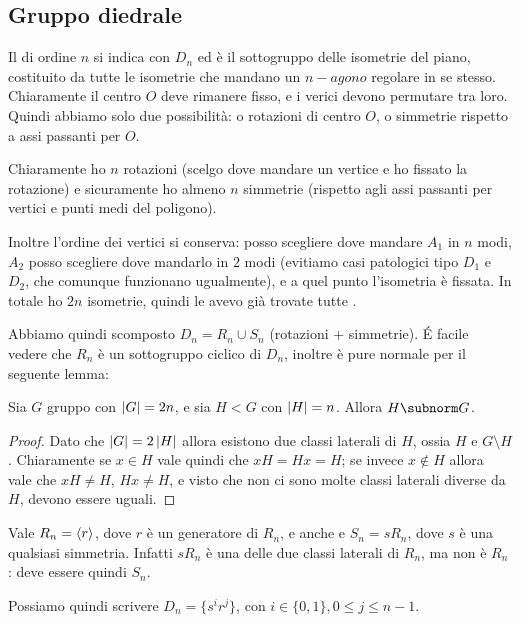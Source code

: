 \documentclass[a4paper,10pt,oneside]{math_article}
\begin{document}
      \subsection{Gruppo diedrale}
      Il  di ordine $n$ si indica con $D_n$ ed è il sottogruppo delle isometrie del piano, costituito da tutte le isometrie che mandano un $n-agono$ regolare in se stesso. Chiaramente il centro $O$ deve rimanere fisso, e i verici devono permutare tra loro. Quindi abbiamo solo due possibilità: o rotazioni di centro $O$, o simmetrie rispetto a assi passanti per $O$.
      
      Chiaramente ho $n$ rotazioni (scelgo dove mandare un vertice e ho fissato la rotazione) e sicuramente ho almeno $n$ simmetrie (rispetto agli assi passanti per vertici e punti medi del poligono). 
      
      Inoltre l'ordine dei vertici si conserva: posso scegliere dove mandare $A_1$ in $n$ modi, $A_2$ posso scegliere dove mandarlo in $2$ modi (evitiamo casi patologici tipo $D_1$ e $D_2$, che comunque funzionano ugualmente), e a quel punto l'isometria è fissata. In totale ho $2n$ isometrie, quindi le avevo già trovate tutte \Cooley.
      
      Abbiamo quindi scomposto $D_n = R_n \cup S_n$ (rotazioni + simmetrie). \'E facile vedere che $R_n$ è un sottogruppo ciclico di $D_n$, inoltre è pure normale per il seguente lemma:
      \begin{mylemma}
       Sia $G$ gruppo con $\left|G\right| = 2n$, e sia $H<G$ con $\left|H\right|=n$. Allora $H \subnorm G$.
      \end{mylemma}
      \begin{proof}
       Dato che $\left|G\right| =2\left|H\right|$ allora esistono due classi laterali di $H$, ossia $H$ e $G\setminus H$. Chiaramente se $x \in H$ vale quindi che $xH=Hx=H$; se invece $x \nin H$ allora vale che $xH\neq H$, $Hx\neq H$, e visto che non ci sono molte classi laterali diverse da $H$, devono essere uguali.
      \end{proof}
      
      Vale $R_n=\left\langle r\right\rangle$, dove $r$ è un generatore di $R_n$, e anche e $S_n=sR_n$, dove $s$ è una qualsiasi simmetria. Infatti $sR_n$ è una delle due classi laterali di $R_n$, ma non è $R_n$: deve essere quindi $S_n$.
      
      Possiamo quindi scrivere $D_n = \{s^ir^j\}$, con $i \in \{0,1\}, 0 \le j \le n-1$.
      
\end{document}
